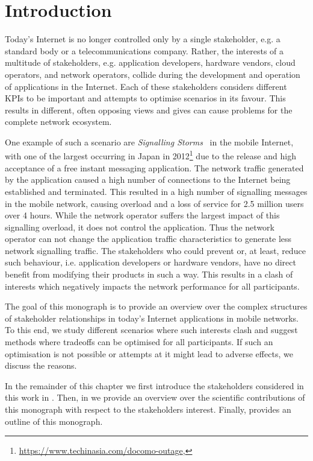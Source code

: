 \chapter{Introduction}\label{chap:introduction}

Today's Internet is no longer controlled only by a single stakeholder, e.g. a standard body or a telecommunications company.
Rather, the interests of a multitude of stakeholders, e.g. application developers, hardware vendors, cloud operators, and network operators, collide during the development and operation of applications in the Internet. 
Each of these stakeholders considers different \glspl{KPI} to be important and attempts to optimise scenarios in its favour.
This results in different, often opposing views and gives can cause problems for the complete network ecosystem. 

One example of such a scenario are \emph{Signalling Storms}~\cite{Huawei2011} in the mobile Internet, with one of the largest occurring in Japan in 2012\footnote{\url{https://www.techinasia.com/docomo-outage}, \accessed} due to the release and high acceptance of a free instant messaging application.
The network traffic generated by the application caused a high number of connections to the Internet being established and terminated.
This resulted in a high number of signalling messages in the mobile network, causing overload and a loss of service for 2.5 million users over 4 hours.
While the network operator suffers the largest impact of this signalling overload, it does not control the application.
Thus the network operator can not change the application traffic characteristics to generate less network signalling traffic. 
The stakeholders who could prevent or, at least, reduce such behaviour, i.e. application developers or hardware vendors, have no direct benefit from modifying their products in such a way.
This results in a clash of interests which negatively impacts the network performance for all participants.

The goal of this monograph is to provide an overview over the complex structures of stakeholder relationships in today's Internet applications in mobile networks.
To this end, we study different scenarios where such interests clash and suggest methods where tradeoffs can be optimised for all participants.
If such an optimisation is not possible or attempts at it might lead to adverse effects, we discuss the reasons.

In the remainder of this chapter we first introduce the stakeholders considered in this work in .
Then, in  we provide an overview over the scientific contributions of this monograph with respect to the stakeholders interest.
Finally,  provides an outline of this monograph.

